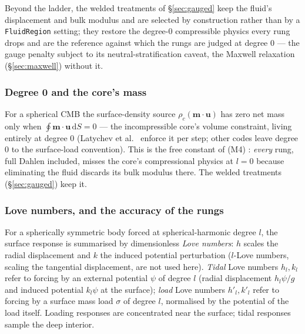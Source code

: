 \documentclass[11pt]{article}
\numberwithin{equation}{section}
\theoremstyle{remark}
\newcommand{\dS}{\,\mathrm{d}S}
\newcommand{\vu}{\mathbf{u}}
\newcommand{\vm}{\mathbf{m}}
\newcommand{\code}[1]{\texttt{#1}}
\begin{document}
Beyond the ladder, the welded treatments of \S\ref{sec:gauged} keep the
fluid's displacement and bulk modulus and are selected by construction
rather than by a \code{FluidRegion} setting; they restore the degree-0
compressible physics every rung drops and are the reference against
which the rungs are judged at degree 0 --- the gauge penalty subject to
its neutral-stratification caveat, the Maxwell relaxation
(\S\ref{sec:maxwell}) without it.

\subsubsection{Degree 0 and the core's mass}
\label{sec:cmb-deg0}

For a spherical CMB the surface-density source $\rho_c(\vm\cdot\vu)$ has
zero net mass only when $\oint\vm\cdot\vu\dS = 0$ --- the incompressible
core's volume constraint, living entirely at degree 0 (Latychev et al.\
\cite{Latychev2005} enforce it per step; other codes leave degree 0 to the
surface-load convention). This is the free constant of (M4) \cite{AW10}:
\emph{every} rung, full Dahlen included, misses the core's compressional
physics at $l=0$ because eliminating the fluid discards its bulk modulus
there. The welded treatments (\S\ref{sec:gauged}) keep it.

\subsubsection{Love numbers, and the accuracy of the rungs}

For a spherically symmetric body forced at spherical-harmonic degree $l$,
the surface response is summarised by dimensionless \emph{Love numbers}:
$h$ scales the radial displacement and $k$ the induced potential
perturbation ($l$-Love numbers, scaling the tangential displacement, are
not used here). \emph{Tidal} Love numbers $h_l, k_l$ refer to forcing by an
external potential $\psi$ of degree $l$ (radial displacement $h_l\psi/g$
and induced potential $k_l\psi$ at the surface); \emph{load} Love numbers
$h'_l, k'_l$ refer to forcing by a surface mass load $\sigma$ of degree
$l$, normalised by the potential of the load itself. Loading responses are
concentrated near the surface; tidal responses sample the deep interior.
\end{document}
